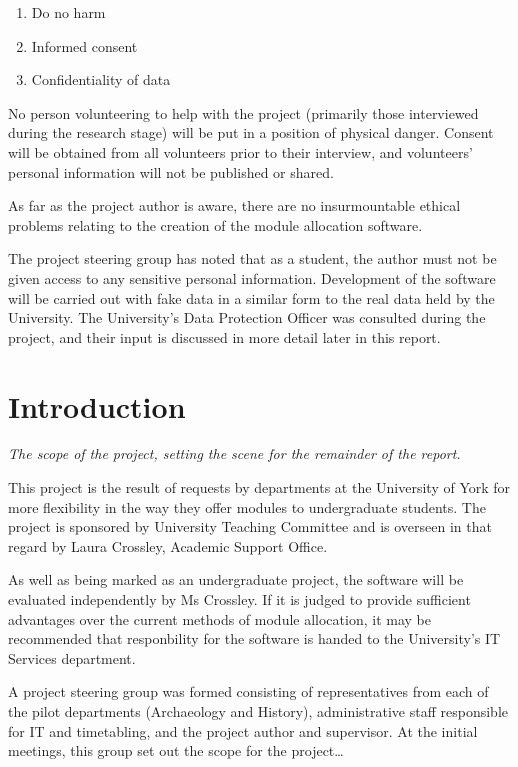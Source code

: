 \documentclass[]{article}
\begin{document}
\begin{enumerate}
  \item Do no harm
  \item Informed consent
  \item Confidentiality of data
\end{enumerate}

No person volunteering to help with the project (primarily those interviewed during the research stage) will be put in a position of physical danger. Consent will be obtained from all volunteers prior to their interview, and volunteers' personal information will not be published or shared.

As far as the project author is aware, there are no insurmountable ethical problems relating to the creation of the module allocation software.

The project steering group has noted that as a student, the author must not be given access to any sensitive personal information. Development of the software will be carried out with fake data in a similar form to the real data held by the University. The University's Data Protection Officer was consulted during the project, and their input is discussed in more detail later in this report.

\section{Introduction}

\textit{The scope of the project, setting the scene for the remainder of the report.}

This project is the result of requests by departments at the University of York for more flexibility in the way they offer modules to undergraduate students. The project is sponsored by University Teaching Committee and is overseen in that regard by Laura Crossley, Academic Support Office.

As well as being marked as an undergraduate project, the software will be evaluated independently by Ms Crossley. If it is judged to provide sufficient advantages over the current methods of module allocation, it may be recommended that responbility for the software is handed to the University's IT Services department.

A project steering group was formed consisting of representatives from each of the pilot departments (Archaeology and History), administrative staff responsible for IT and timetabling, and the project author and supervisor. At the initial meetings, this group set out the scope for the project…
\end{document}
